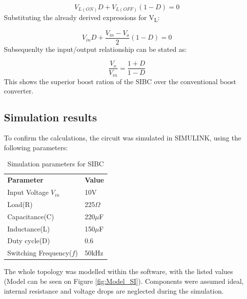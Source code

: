 \begin{equation}
	V_{L(ON)}D+V_{L(OFF)}(1-D)=0
	\label{eq:SI_IVSB}
\end{equation}
Substituting the already derived expressions for V\textsubscript{L}:

\begin{equation}
	V_{in}D+\frac{V_{in} - V_o}{2}(1-D)=0
	\label{eq:SI_IVSB2}
\end{equation}
Subsequenlty the input/output relationship can be stated as:

\begin{equation}
	\frac{V_o}{V_{in}} = \frac{1+D}{1-D}
	\label{eq:SI_VO_VIN}
\end{equation}
This shows the superior boost ration of the SIBC over the conventional boost converter. 

\subsection{Simulation results}

To confirm the calculations, the circuit was simulated in SIMULINK, using the following parameters: 

\begin{table}[H]
\begin{center}
\caption {Simulation parameters for SIBC} \label{tab:SI} 
\begin{tabular}{|l|l|}
\cline{1-2}
\textbf{Parameter} & \textbf{Value}  \\ \cline{1-2}
Input Voltage $V_{in}$          &      10V   \\ \cline{1-2}
Load(R)   & 225$\Omega$           \\ \cline{1-2}
Capacitance(C)          &       220$\mu$F     \\ \cline{1-2}
Inductance(L)          &      150$\mu$F      \\ \cline{1-2}
Duty cycle(D)          &     0.6       \\ \cline{1-2}
Switching Frequency($f$)          &      50kHz      \\ \cline{1-2}
\end{tabular}
\end{center}
\end{table}

The whole topology was modelled within the software, with the listed values (Model can be seen on Figure \ref{fig:Model_SI}). Components were assumed ideal, internal resistance and voltage drops are neglected during the simulation. 


